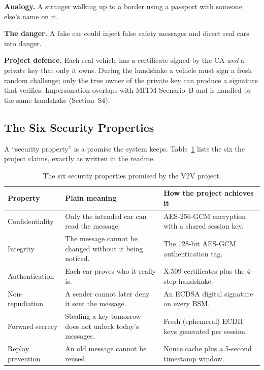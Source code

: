 \documentclass[11pt,a4paper]{report}
\begin{document}
\textbf{Analogy.} A stranger walking up to a border using a passport with
someone else's name on it.

\textbf{The danger.} A fake car could inject false safety messages and direct
real cars into danger.

\textbf{Project defence.} Each real vehicle has a certificate signed by the CA
\emph{and} a private key that only it owns. During the handshake a vehicle must
sign a fresh random challenge; only the true owner of the private key can
produce a signature that verifies. Impersonation overlaps with MITM Scenario~B
and is handled by the same handshake (Section~S4).

\subsection{The Six Security Properties}
A ``security property'' is a promise the system keeps. Table~\ref{tab:props}
lists the six the project claims, exactly as written in the readme.

\begin{table}[h]
\centering
\small
\begin{tabular}{@{}p{2.9cm} p{5.0cm} p{5.6cm}@{}}
\toprule
\textbf{Property} & \textbf{Plain meaning} & \textbf{How the project achieves it}\\
\midrule
Confidentiality & Only the intended car can read the message. &
AES-256-GCM encryption with a shared session key.\\
Integrity & The message cannot be changed without it being noticed. &
The 128-bit AES-GCM authentication tag.\\
Authentication & Each car proves who it really is. &
X.509 certificates plus the 4-step handshake.\\
Non-repudiation & A sender cannot later deny it sent the message. &
An ECDSA digital signature on every BSM.\\
Forward secrecy & Stealing a key tomorrow does not unlock today's messages. &
Fresh (ephemeral) ECDH keys generated per session.\\
Replay prevention & An old message cannot be reused. &
Nonce cache plus a 5-second timestamp window.\\
\bottomrule
\end{tabular}
\caption{The six security properties promised by the V2V project.}
\label{tab:props}
\end{table}
\end{document}
